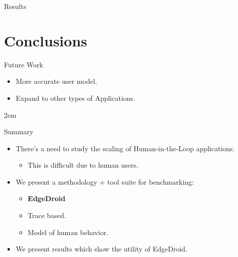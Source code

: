 \documentclass[aspectratio=1610]{beamer}
\begin{document}
\begin{frame}{Results}
\begin{center}
{        }%
    \end{center}
\end{frame}

\section{Conclusions}
\begin{ssframe}{Future Work}
    \begin{itemize}
        \itemsep2em
        \item More accurate user model.
        \item Expand to other types of Applications.
    \end{itemize}
\end{ssframe}\itemsep2em

\begin{ssframe}{Summary}
    \begin{itemize}
        \itemsep2em
        \item There's a need to study the scaling of Human-in-the-Loop applications.
        \begin{itemize}
            \item This is difficult due to human users.
        \end{itemize}
        \item We present a methodology + tool suite for benchmarking:
        \begin{itemize}
            \item \textbf{EdgeDroid}
            \item Trace based.
            \item Model of human behavior.
        \end{itemize}
        \item We present results which show the utility of EdgeDroid.
    \end{itemize}
\end{ssframe}
\end{document}
